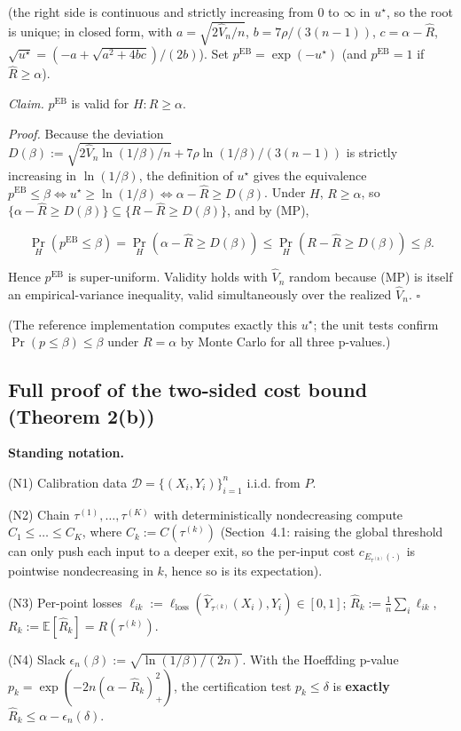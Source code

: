 \documentclass{ieeeaccess}
\begin{document}
(the right side is continuous and strictly increasing from $0$ to $\infty$ in $u^\star$, so the root is unique; in closed form, with $a=\sqrt{2\hat V_n/n}$, $b=7\rho/(3(n-1))$, $c=\alpha-\hat R$, $\sqrt{u^\star}=(-a+\sqrt{a^2+4bc})/(2b)$). Set $p^{\mathrm{EB}}=\exp(-u^\star)$ (and $p^{\mathrm{EB}}=1$ if $\hat R\ge\alpha$).

\emph{Claim.} $p^{\mathrm{EB}}$ is valid for $H:R\ge\alpha$.

\emph{Proof.} Because the deviation $D(\beta):=\sqrt{2\hat V_n\ln(1/\beta)/n}+7\rho\ln(1/\beta)/(3(n-1))$ is strictly increasing in $\ln(1/\beta)$, the definition of $u^\star$ gives the equivalence $p^{\mathrm{EB}}\le\beta\iff u^\star\ge\ln(1/\beta)\iff \alpha-\hat R\ge D(\beta)$. Under $H$, $R\ge\alpha$, so $\{\alpha-\hat R\ge D(\beta)\}\subseteq\{R-\hat R\ge D(\beta)\}$, and by (MP),

\[
\Pr_H(p^{\mathrm{EB}}\le\beta)=\Pr_H(\alpha-\hat R\ge D(\beta))\le\Pr_H(R-\hat R\ge D(\beta))\le\beta.
\]

Hence $p^{\mathrm{EB}}$ is super-uniform. Validity holds with $\hat V_n$ random because (MP) is itself an empirical-variance inequality, valid simultaneously over the realized $\hat V_n$. $\square$

(The reference implementation computes exactly this $u^\star$; the unit tests confirm $\Pr(p\le\beta)\le\beta$ under $R=\alpha$ by Monte Carlo for all three p-values.)

\subsection{Full proof of the two-sided cost bound (Theorem 2(b))}

\textbf{Standing notation.}

(N1) Calibration data $\mathcal D=\{(X_i,Y_i)\}_{i=1}^n$ i.i.d. from $P$.

(N2) Chain $\tau^{(1)},\dots,\tau^{(K)}$ with deterministically nondecreasing compute $C_1\le\dots\le C_K$, where $C_k:=C(\tau^{(k)})$ (Section~4.1: raising the global threshold can only push each input to a deeper exit, so the per-input cost $c_{E_{\tau^{(k)}}(\cdot)}$ is pointwise nondecreasing in $k$, hence so is its expectation).

(N3) Per-point losses $\ell_{ik}:=\ell_{\mathrm{loss}}(\hat Y_{\tau^{(k)}}(X_i),Y_i)\in[0,1]$; $\hat R_k:=\frac1n\sum_i\ell_{ik}$, $R_k:=\mathbb E[\hat R_k]=R(\tau^{(k)})$.

(N4) Slack $\epsilon_n(\beta):=\sqrt{\ln(1/\beta)/(2n)}$. With the Hoeffding p-value $p_k=\exp(-2n(\alpha-\hat R_k)_+^2)$, the certification test $p_k\le\delta$ is \textbf{exactly} $\hat R_k\le\alpha-\epsilon_n(\delta)$.
\end{document}
